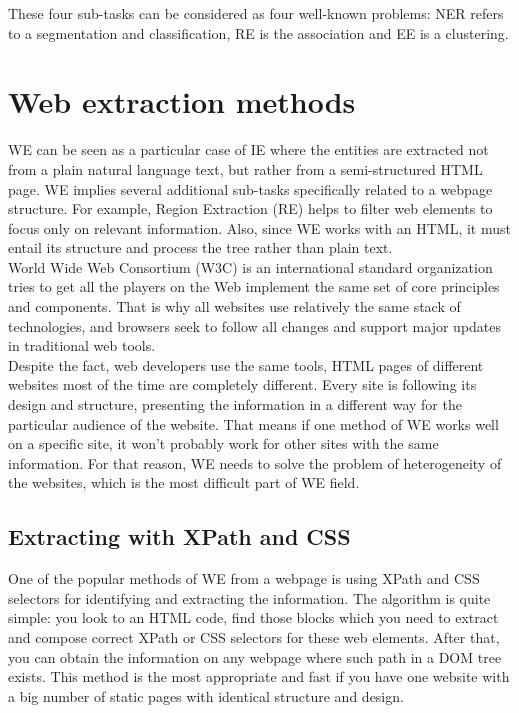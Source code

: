 These four sub-tasks can be considered as four well-known problems: NER refers to a segmentation and classification, RE is the association and EE is a clustering\cite{ManLect}.\\

\section{Web extraction methods}


WE can be seen as a particular case of IE where the entities are extracted not from a plain natural language text, but rather from a semi-structured HTML page. WE implies several additional sub-tasks specifically related to a webpage structure. For example, Region Extraction (RE) helps to filter web elements to focus only on relevant information. Also, since WE works with an HTML, it must entail its structure and process the tree rather than plain text. \\

World Wide Web Consortium (W3C) is an international standard organization tries to get all the players on the Web implement the same set of core principles and components. That is why all websites use relatively the same stack of technologies, and browsers seek to follow all changes and support major updates in traditional web tools.\\

Despite the fact, web developers use the same tools, HTML pages of different websites most of the time are completely different. Every site is following its design and structure, presenting the information in a different way for the particular audience of the website. That means if one method of WE works well on a specific site, it won't probably work for other sites with the same information. For that reason, WE needs to solve the problem of heterogeneity of the websites, which is the most difficult part of WE field.

\subsection{Extracting with XPath and CSS}

One of the popular methods of WE from a webpage is using XPath and CSS selectors for identifying and extracting the information. The algorithm is quite simple: you look to an HTML code, find those blocks which you need to extract and compose correct XPath or CSS selectors for these web elements. After that, you can obtain the information on any webpage where such path in a DOM tree exists.  This method is the most appropriate and fast if you have one website with a big number of static pages with identical structure and design. \\

